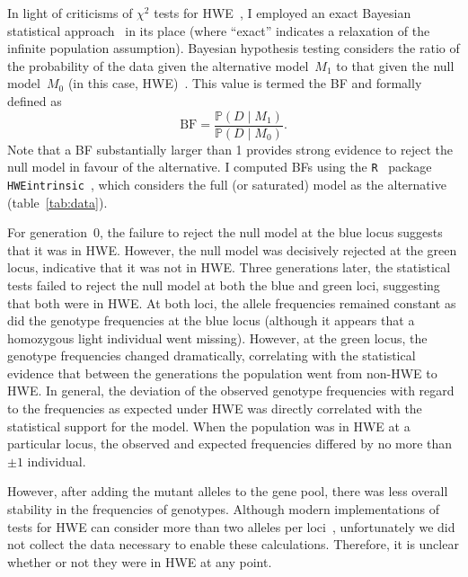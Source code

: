 \documentclass{article}
\begin{document}
    In light of criticisms of $\chi^2$ tests for \ac{HWE}~\cite{WCA05},
        I employed an exact Bayesian statistical approach~\cite{CMV11} in its
        place (where \enquote{exact} indicates a relaxation of the infinite
        population assumption).
    Bayesian hypothesis testing considers the ratio of the probability of the
        data given the alternative model~$M_1$ to that given the null
        model~$M_0$ (in this case, \ac{HWE})~\cite{Wak10}.
    This value is termed the \ac{BF} and formally defined as
    \begin{equation}
        \text{BF} = \frac{\mathbb{P}\left(D\mid M_1\right)}
                         {\mathbb{P}\left(D\mid M_0\right)}.
    \end{equation}
    Note that a \ac{BF} substantially larger than 1 provides strong evidence
        to reject the null model in favour of the alternative.
    I computed \ac{BF}s using the \texttt{R}~\cite{RCT14} package
        \texttt{HWEintrinsic}~\cite{Ven12}, which considers the full (or
        saturated) model as the alternative~\cite{CMV11}
        (table~\ref{tab:data}).

    For generation~0, the failure to reject the null model at the blue locus
        suggests that it was in \ac{HWE}. However, the null model was
        decisively rejected at the green locus, indicative that it was not in
        \ac{HWE}.
    Three generations later, the statistical tests failed to reject the null
        model at both the blue and green loci, suggesting that both were in
        \ac{HWE}.
    At both loci, the allele frequencies remained constant as did the genotype
        frequencies at the blue locus (although it appears that a homozygous
        light individual went missing).
    However, at the green locus, the genotype frequencies changed dramatically,
        correlating with the statistical evidence that between the generations
        the population went from non-\ac{HWE} to \ac{HWE}.
    In general, the deviation of the observed genotype frequencies with regard
        to the frequencies as expected under \ac{HWE} was directly correlated
        with the statistical support for the model.
    When the population was in \ac{HWE} at a particular locus, the observed and
        expected frequencies differed by no more than~$\pm1$ individual.

    However, after adding the mutant alleles to the gene pool, there was less
        overall stability in the frequencies of genotypes.
    Although modern implementations of tests for \ac{HWE} can consider more
        than two alleles per loci~\cite{Wak10}, unfortunately we did not
        collect the data necessary to enable these calculations.
    Therefore, it is unclear whether or not they were in \ac{HWE} at any point.
\end{document}
